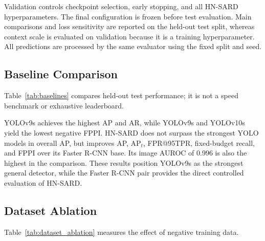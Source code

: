 \documentclass[conference,a4paper]{IEEEtran}
\begin{document}
Validation controls checkpoint selection, early stopping, and all HN-SARD hyperparameters. The final configuration is frozen before test evaluation. Main comparisons and loss sensitivity are reported on the held-out test split, whereas context scale is evaluated on validation because it is a training hyperparameter. All predictions are processed by the same evaluator using the fixed split and seed.

\subsection{Baseline Comparison}
Table~\ref{tab:baselines} compares held-out test performance; it is not a speed benchmark or exhaustive leaderboard.

YOLOv9s achieves the highest AP and AR, while YOLOv9s and YOLOv10s yield the lowest negative FPPI. HN-SARD does not surpass the strongest YOLO models in overall AP, but improves AP, AP$_t$, FPR@95TPR, fixed-budget recall, and FPPI over its Faster R-CNN base. Its image AUROC of 0.996 is also the highest in the comparison. These results position YOLOv9s as the strongest general detector, while the Faster R-CNN pair provides the direct controlled evaluation of HN-SARD.

\subsection{Dataset Ablation}
Table~\ref{tab:dataset_ablation} measures the effect of negative training data.

\begin{table}[!t]
\centering
\caption{Faster R-CNN dataset ablation.}
\label{tab:dataset_ablation}
\end{table}
\end{document}
